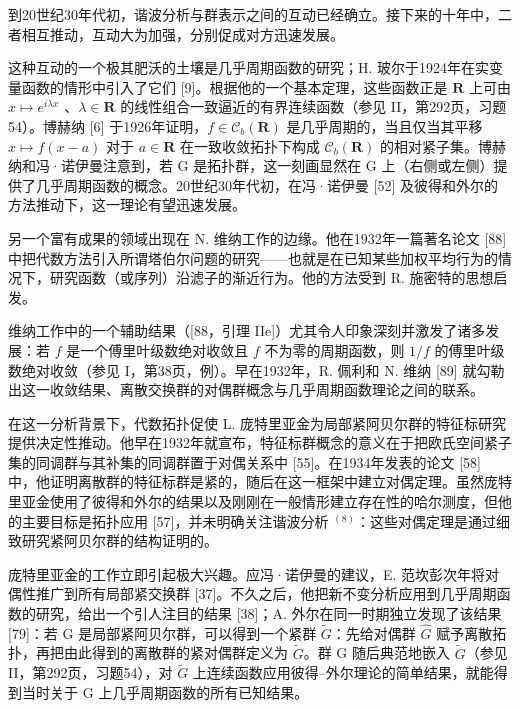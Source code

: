 
到20世纪30年代初，谐波分析与群表示之间的互动已经确立。接下来的十年中，二者相互推动，互动大为加强，分别促成对方迅速发展。

这种互动的一个极其肥沃的土壤是几乎周期函数的研究；H. 玻尔于1924年在实变量函数的情形中引入了它们 {[}9{]}。根据他的一个基本定理，这些函数正是 \(\mathbf{R}\) 上可由 \(x \mapsto e^{i\lambda x}\) 、\(\lambda \in \mathbf{R}\) 的线性组合一致逼近的有界连续函数（参见 II，第292页，习题54）。博赫纳 {[}6{]} 于1926年证明，\(f \in \mathcal{C}_b(\mathbf{R})\) 是几乎周期的，当且仅当其平移 \(x \mapsto f(x - a)\) 对于 \(a \in \mathbf{R}\) 在一致收敛拓扑下构成 \(\mathcal{C}_b(\mathbf{R})\) 的相对紧子集。博赫纳和冯·诺伊曼注意到，若 G 是拓扑群，这一刻画显然在 G 上（右侧或左侧）提供了几乎周期函数的概念。20世纪30年代初，在冯·诺伊曼 {[}52{]} 及彼得和外尔的方法推动下，这一理论有望迅速发展。

另一个富有成果的领域出现在 N. 维纳工作的边缘。他在1932年一篇著名论文 {[}88{]} 中把代数方法引入所谓塔伯尔问题的研究——也就是在已知某些加权平均行为的情况下，研究函数（或序列）沿滤子的渐近行为。他的方法受到 R. 施密特的思想启发。

维纳工作中的一个辅助结果（{[}88，引理 IIe{]}）尤其令人印象深刻并激发了诸多发展：若 \(f\) 是一个傅里叶级数绝对收敛且 \(f\) 不为零的周期函数，则 \(1/f\) 的傅里叶级数绝对收敛（参见 I，第38页，例）。早在1932年，R. 佩利和 N. 维纳 {[}89{]} 就勾勒出这一收敛结果、离散交换群的对偶群概念与几乎周期函数理论之间的联系。

在这一分析背景下，代数拓扑促使 L. 庞特里亚金为局部紧阿贝尔群的特征标研究提供决定性推动。他早在1932年就宣布，特征标群概念的意义在于把欧氏空间紧子集的同调群与其补集的同调群置于对偶关系中 {[}55{]}。在1934年发表的论文 {[}58{]} 中，他证明离散群的特征标群是紧的，随后在这一框架中建立对偶定理。虽然庞特里亚金使用了彼得和外尔的结果以及刚刚在一般情形建立存在性的哈尔测度，但他的主要目标是拓扑应用 {[}57{]}，并未明确关注谐波分析 \(^{(8)}\)：这些对偶定理是通过细致研究紧阿贝尔群的结构证明的。

庞特里亚金的工作立即引起极大兴趣。应冯·诺伊曼的建议，E. 范坎彭次年将对偶性推广到所有局部紧交换群 {[}37{]}。不久之后，他把新不变分析应用到几乎周期函数的研究，给出一个引人注目的结果 {[}38{]}；A. 外尔在同一时期独立发现了该结果 {[}79{]}：若 G 是局部紧阿贝尔群，可以得到一个紧群 \(\widetilde{G}\)：先给对偶群 \(\widehat{G}\) 赋予离散拓扑，再把由此得到的离散群的紧对偶群定义为 \(\widetilde{G}\)。群 G 随后典范地嵌入 \(\widetilde{G}\)（参见 II，第292页，习题54），对 \(\widetilde{G}\) 上连续函数应用彼得--外尔理论的简单结果，就能得到当时关于 G 上几乎周期函数的所有已知结果。

